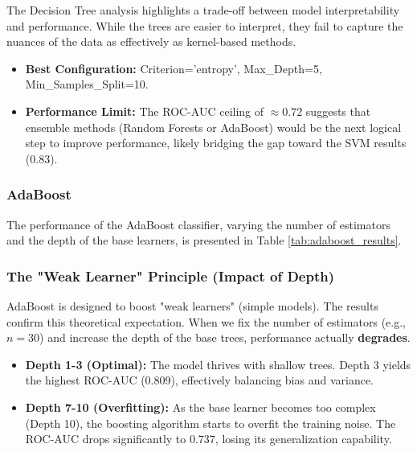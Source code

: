 \documentclass[12pt,a4paper]{article}
\begin{document}
The Decision Tree analysis highlights a trade-off between model interpretability and performance. While the trees are easier to interpret, they fail to capture the nuances of the data as effectively as kernel-based methods.

\begin{itemize}
    \item \textbf{Best Configuration:} Criterion='entropy', Max\_Depth=5, Min\_Samples\_Split=10.
    \item \textbf{Performance Limit:} The ROC-AUC ceiling of $\approx 0.72$ suggests that ensemble methods (Random Forests or AdaBoost) would be the next logical step to improve performance, likely bridging the gap toward the SVM results (0.83).
\end{itemize}



\subsubsection{AdaBoost}
The performance of the AdaBoost classifier, varying the number of estimators and the depth of the base learners, is presented in Table \ref{tab:adaboost_results}.

\subsubsection*{The "Weak Learner" Principle (Impact of Depth)}
AdaBoost is designed to boost "weak learners" (simple models). The results confirm this theoretical expectation. When we fix the number of estimators (e.g., $n=30$) and increase the depth of the base trees, performance actually \textbf{degrades}.

\begin{itemize}
    \item \textbf{Depth 1-3 (Optimal):} The model thrives with shallow trees. Depth 3 yields the highest ROC-AUC (0.809), effectively balancing bias and variance.
    \item \textbf{Depth 7-10 (Overfitting):} As the base learner becomes too complex (Depth 10), the boosting algorithm starts to overfit the training noise. The ROC-AUC drops significantly to 0.737, losing its generalization capability.
\end{itemize}
\end{document}

